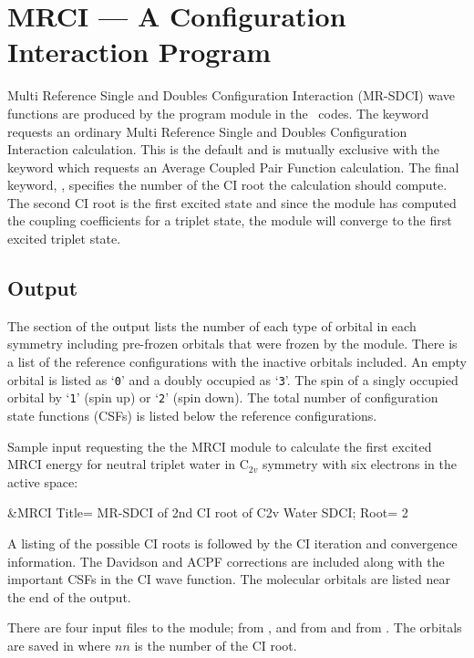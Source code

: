 \section{MRCI --- A Configuration Interaction Program}
\label{TUT:sec:mrci}
Multi Reference Single and Doubles Configuration Interaction (MR-SDCI)
wave functions are produced by the  program module in
the \molcas\ codes.  
The  keyword requests an
ordinary Multi Reference Single and Doubles Configuration Interaction
calculation.  This is the default and is mutually exclusive with the
 keyword which requests an Average Coupled Pair Function
calculation.  The final keyword, , specifies the number
of the CI root the calculation should compute.  The second CI root is
the first excited state and since the  module has computed the
coupling coefficients for a triplet state, the  module will
converge to the first excited triplet state.

\subsection{ Output}

The  section of the output lists the number of each type
of orbital in each symmetry including pre-frozen orbitals that were
frozen by the  module.  There is a list of the
reference configurations with the inactive orbitals included.  An empty
orbital is listed as `{\tt 0}' and a doubly occupied as `{\tt 3}'.  The
spin of a singly occupied orbital by `{\tt 1}' (spin up) or `{\tt 2}'
(spin down).  The total
number of configuration state functions (CSFs) is listed below the reference
configurations.

Sample input requesting the the MRCI module to calculate the first 
excited MRCI energy for neutral triplet water in C$_{2v}$ symmetry with six 
electrons in the active space:
\begin{inputlisting}
 &MRCI
Title= MR-SDCI of 2nd CI root of C2v Water
SDCI; Root= 2
\end{inputlisting}

A listing of the possible CI roots is followed by the CI iteration and
convergence information.  The Davidson and ACPF corrections are included
along with the important CSFs in the CI wave function.  The molecular
orbitals are listed near the end of the output.

There are four input files to the  module; 
from ,  and  from
 and  from .  The orbitals
are saved in  where $nn$ is the number of the CI root.
